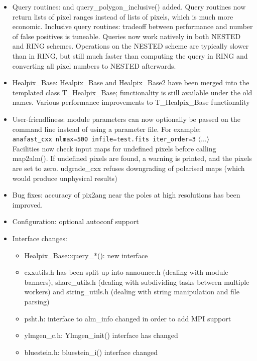 \documentclass[12pt,twoside]{article}
\makeatletter
\newcommand{\nop}[1]{\Hy@raisedlink{\hypertarget{#1}{}}}
\newcommand{\mytarget}[1]{\nop{#1}}%
\newcommand{\mytarget}[1]{\label{#1}}
\makeatother
\begin{document}
{{
\begin{itemize}
	\setlength{\itemsep}{0pt}
	\setlength{\parsep}{0pt}
	\item Query routines:
 \mytarget{install:cpp:query}{query\_polygon()} and query\_polygon\_inclusive() added.
Query routines now return lists of pixel ranges instead of lists of pixels,
 which is much more economic.
Inclusive query routines: tradeoff between performance and number of false
 positives is tuneable.
Queries now work natively in both NESTED and RING schemes. Operations on
 the NESTED scheme are typically slower than in RING, but still much faster
 than computing the query in RING and converting all pixel numbers to NESTED
 afterwards.

\item Healpix\_Base:
Healpix\_Base and Healpix\_Base2 have been merged into the templated class
 T\_Healpix\_Base; functionality is still available under the old names.
Various performance improvements to T\_Healpix\_Base functionality

\item User-friendliness:
module parameters can now optionally be passed on the command line instead
 of using a parameter file. For example:\\
   {\tt anafast\_cxx nlmax=500 infile=test.fits iter\_order=3} $\langle\ldots\rangle$\\
Facilities now check input maps for undefined pixels before calling map2alm().
 If undefined pixels are found, a warning is printed, and the pixels are set
 to zero. udgrade\_cxx refuses downgrading of polarised maps (which would produce
 unphysical results)
%
\item Bug fixes: accuracy of pix2ang near the poles at high resolutions has been improved.
%
\item Configuration: optional autoconf support
%
\item Interface changes:
%
\begin{itemize}
	\setlength{\itemsep}{0pt}
	\setlength{\parsep}{0pt}
\item Healpix\_Base::query\_*(): new interface
\item cxxutils.h has been split up into
 announce.h (dealing with module banners), 
 share\_utils.h (dealing with subdividing tasks between multiple workers) and
 string\_utils.h (dealing with string manipulation and file parsing)
\item psht.h: interface to alm\_info changed in order to add MPI support
\item ylmgen\_c.h: Ylmgen\_init() interface has changed
\item bluestein.h: bluestein\_i() interface changed
\end{itemize}


\end{itemize}}}
\end{document}
